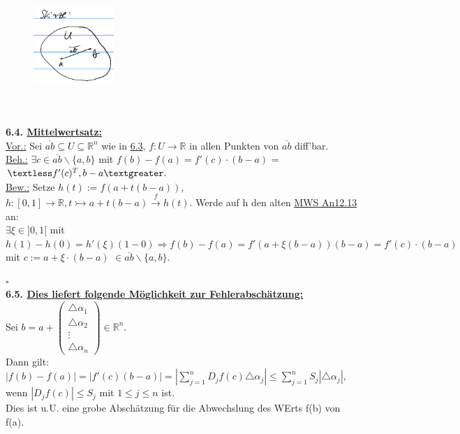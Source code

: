 \documentclass[]{scrartcl}
\begin{document}
\begin{figure}[h]
	\includegraphics[width=3 cm,height=3cm]{bsp kap 6.3}
\end{figure}\\
\\
\textbf{6.4. \ul{Mittelwertsatz:}}\\
\underline{Vor.:} Sei $\overline{ab}\subseteq U\subseteq \mathbb{R}^n$ wie in 
\ul{6.3}, $f:U\rightarrow\mathbb{R}$ in allen Punkten von 
$\overline{ab}$ diff'bar.\\
\underline{Beh.:} \ul{$\exists c \in 
\overline{ab}\backslash\{a,b\}$} mit \ul{$f(b)-f(a)=f'(c)\cdot(b-a)$} = 
$\textless f'(c)^T, b-a\textgreater.$\\
\underline{Bew.:} Setze \ul{$h(t):=f(a+t(b-a))$}, 
$h:[0,1]\rightarrow\mathbb{R}, t\rightarrowtail a +t(b-a)\xrightarrow{f} h(t).$ 
Werde auf h den alten \ul{MWS An12.13} an:\\
$\exists \xi \in ]0,1[$ mit $h(1)-h(0)=h'(\xi)(1-0) \Rightarrow f(b)-f(a)= 
f'(a+\xi(b-a))(b-a)=f'(c)\cdot(b-a)$\\
mit \ul{$c:=a+\xi\cdot(b-a)$} 
$\in\overline{ab}\backslash\{a,b\}$.\\
\strut\hfill$\square$\\
\textbf{6.5. \underline{Dies liefert folgende Möglichkeit zur 
Fehlerabschätzung:}}\\
Sei $b=a+\begin{pmatrix}
	\triangle\alpha_1\\\triangle\alpha_2\\\vdots\\\triangle\alpha_n
\end{pmatrix}\in\mathbb{R}^n.$\\
Dann gilt: 
$|f(b)-f(a)|=|f'(c)(b-a)|=|\sum_{j=1}^{n}D_jf(c)\triangle\alpha_j|\leq\sum_{j=1}^{n}
 S_j|\triangle\alpha_j|,$\\
 wenn $|D_jf(c)|\leq S_j$ mit $1\leq j\leq n$ ist.\\
 Dies ist u.U. eine grobe Abschätzung für die Abwechslung des WErts f(b) von 
 f(a).\\
 \\
\end{document}
